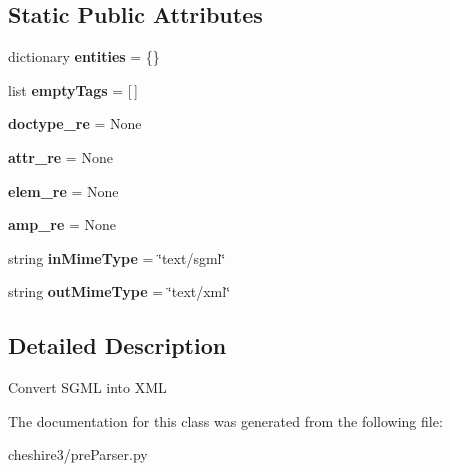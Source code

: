 \subsection*{Static Public Attributes}
\begin{DoxyCompactItemize}
\item 
\hypertarget{classcheshire3_1_1pre_parser_1_1_sgml_pre_parser_a047513e85eed68438f6d47200229da1b}{dictionary {\bfseries entities} = \{\}}\label{classcheshire3_1_1pre_parser_1_1_sgml_pre_parser_a047513e85eed68438f6d47200229da1b}

\item 
\hypertarget{classcheshire3_1_1pre_parser_1_1_sgml_pre_parser_af53452a526e0cde32da9bf88c9c38670}{list {\bfseries empty\-Tags} = \mbox{[}$\,$\mbox{]}}\label{classcheshire3_1_1pre_parser_1_1_sgml_pre_parser_af53452a526e0cde32da9bf88c9c38670}

\item 
\hypertarget{classcheshire3_1_1pre_parser_1_1_sgml_pre_parser_a7414e86e1c58083a25948a042ae00de3}{{\bfseries doctype\-\_\-re} = None}\label{classcheshire3_1_1pre_parser_1_1_sgml_pre_parser_a7414e86e1c58083a25948a042ae00de3}

\item 
\hypertarget{classcheshire3_1_1pre_parser_1_1_sgml_pre_parser_a96dbaae106bd1a3373f1a80d41076213}{{\bfseries attr\-\_\-re} = None}\label{classcheshire3_1_1pre_parser_1_1_sgml_pre_parser_a96dbaae106bd1a3373f1a80d41076213}

\item 
\hypertarget{classcheshire3_1_1pre_parser_1_1_sgml_pre_parser_aecf7dfb446f06fae8e6720f034bbe40f}{{\bfseries elem\-\_\-re} = None}\label{classcheshire3_1_1pre_parser_1_1_sgml_pre_parser_aecf7dfb446f06fae8e6720f034bbe40f}

\item 
\hypertarget{classcheshire3_1_1pre_parser_1_1_sgml_pre_parser_a0b526e51f0de5afdedba696a3dfeee38}{{\bfseries amp\-\_\-re} = None}\label{classcheshire3_1_1pre_parser_1_1_sgml_pre_parser_a0b526e51f0de5afdedba696a3dfeee38}

\item 
\hypertarget{classcheshire3_1_1pre_parser_1_1_sgml_pre_parser_a251697c40f61d2ddf81ce81ac0605862}{string {\bfseries in\-Mime\-Type} = \char`\"{}text/sgml\char`\"{}}\label{classcheshire3_1_1pre_parser_1_1_sgml_pre_parser_a251697c40f61d2ddf81ce81ac0605862}

\item 
\hypertarget{classcheshire3_1_1pre_parser_1_1_sgml_pre_parser_a09f5f48913c318c5a0b05e147b69c4d9}{string {\bfseries out\-Mime\-Type} = \char`\"{}text/xml\char`\"{}}\label{classcheshire3_1_1pre_parser_1_1_sgml_pre_parser_a09f5f48913c318c5a0b05e147b69c4d9}

\end{DoxyCompactItemize}


\subsection{Detailed Description}
\begin{DoxyVerb}Convert SGML into XML \end{DoxyVerb}
 

The documentation for this class was generated from the following file\-:\begin{DoxyCompactItemize}
\item 
cheshire3/pre\-Parser.\-py\end{DoxyCompactItemize}
